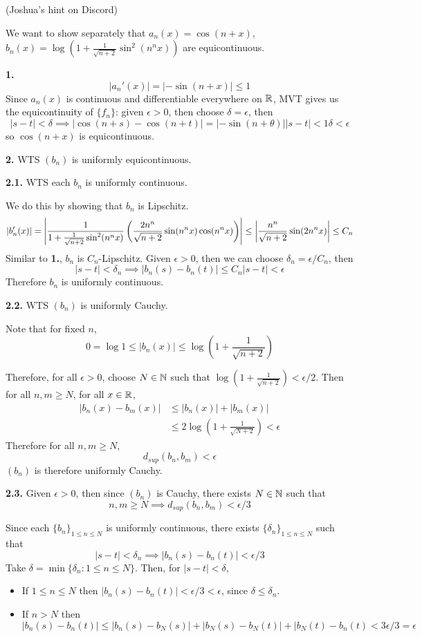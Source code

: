 \documentclass[a4paper, 12pt]{article}
\begin{document}
\begin{solution}
    (Joshua's hint on Discord)

    We want to show separately that $a_n(x) = \cos(n+x)$, $b_n(x) = \log \left(1 + \frac{1}{\sqrt{n+2}} \sin^2(n^nx)\right)$ are equicontinuous.

    \textbf{1.} \[
        |a_n'(x)| = |-\sin(n+x)| \leq 1
    \]
    Since $a_n(x)$ is continuous and differentiable everywhere on $\bbr$, MVT gives us the equicontinuity of $\{f_n\}$: given $\epsilon > 0$, then choose $\delta = \epsilon$, then \[
        |s - t| < \delta \implies |\cos(n+ s) - \cos(n+ t)| = |-\sin(n+ \theta)| |s - t| < 1\delta < \epsilon
    \]
    so $\cos(n+x)$ is equicontinuous.

    \textbf{2.} WTS $(b_n) $ is uniformly equicontinuous.

    \textbf{2.1.} WTS each $b_n$ is uniformly continuous.

    We do this by showing that $b_n$ is Lipschitz. \[
    |b_n'(x)| = \abs*{\frac{1}{1+\frac{1}{\sqrt{n+2}}\sin^2(n^nx)}\left(\frac{2n^n}{\sqrt{n+2}}\sin(n^nx)\cos(n^nx)\right)} \leq \abs*{\frac{n^n}{\sqrt{n+2}}\sin(2n^nx)} \leq C_n
    \]
    Similar to \textbf{1.}, $b_n$ is $C_n$-Lipschitz. Given $\epsilon > 0$, then we can choose $\delta_n = \epsilon /C_n$, then \[
    |s - t| < \delta_n \implies |b_n(s) - b_n(t)| \leq C_n |s-t| < \epsilon
    \]
    Therefore $b_n$ is uniformly continuous.

    \textbf{2.2.} WTS $(b_n)$ is uniformly Cauchy.

    Note that for fixed $n$, \[
    0 = \log 1 \leq |b_n(x)| \leq \log\left(1 + \frac{1}{\sqrt{n+2}}\right)
    \]

    Therefore, for all $\epsilon > 0$, choose $N \in \bbn$ such that $ \log\left(1 + \frac{1}{\sqrt{n+2}} \right)< \epsilon /2$. Then for all $n, m \geq N$, for all $x \in \bbr$,
    \begin{align*}
        |b_n(x) - b_m(x)| &\leq |b_n(x)| + |b_m(x)| \\
        &\leq 2\log\left(1 + \frac{1}{\sqrt{N+2}}\right) < \epsilon
    \end{align*}
    Therefore for all $n, m \geq N$, \[
    d_{sup}(b_n, b_m) < \epsilon
    \]
    $(b_n)$ is therefore uniformly Cauchy.

    \textbf{2.3.} Given $\epsilon > 0$, then since $(b_n)$ is Cauchy, there exists $N \in \bbn$ such that \[
    n, m \geq N \implies d_{sup}(b_n, b_m) < \epsilon /3
    \]

    Since each $\{b_n\}_{1 \leq n \leq N}$ is uniformly continuous, there exists $\{\delta_n\}_{1\leq n \leq N}$ such that \[
    |s - t| < \delta_n \implies |b_n(s) - b_n(t)| < \epsilon /3
    \]
    Take $\delta = \min\{\delta_n : 1 \leq n \leq N\}$. Then, for $|s - t| < \delta$, 
    \begin{itemize}
        \item If $1 \leq n \leq N$ then $|b_n(s) - b_n(t)| < \epsilon / 3 < \epsilon$, since $\delta \leq \delta_n$. 
        \item If $n > N$ then \[
        |b_n(s) - b_n(t)| \leq |b_n(s) - b_N(s)| + |b_N(s) - b_N(t)| + |b_N(t) - b_n(t) < 3\epsilon / 3 = \epsilon
        \]
    \end{itemize}


\end{solution}
\end{document}
